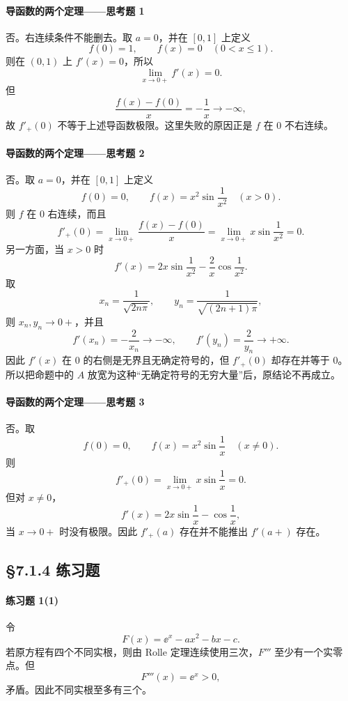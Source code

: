 \paragraph{导函数的两个定理——思考题 1}
\begin{xsolution}
否。右连续条件不能删去。取 $a=0$，并在 $[0,1]$ 上定义
\[
  f(0)=1,
  \qquad
  f(x)=0\quad(0<x\leqslant1).
\]
则在 $(0,1)$ 上 $f'(x)=0$，所以
\[
  \lim_{x\to0+}f'(x)=0.
\]
但
\[
  \frac{f(x)-f(0)}x=-\frac1x\to-\infty,
\]
故 $f'_+(0)$ 不等于上述导函数极限。这里失败的原因正是 $f$ 在 $0$ 不右连续。
\end{xsolution}

\paragraph{导函数的两个定理——思考题 2}
\begin{xsolution}
否。取 $a=0$，并在 $[0,1]$ 上定义
\[
  f(0)=0,
  \qquad
  f(x)=x^2\sin\frac1{x^2}\quad(x>0).
\]
则 $f$ 在 $0$ 右连续，而且
\[
  f'_+(0)=\lim_{x\to0+}\frac{f(x)-f(0)}x
  =\lim_{x\to0+}x\sin\frac1{x^2}=0.
\]
另一方面，当 $x>0$ 时
\[
  f'(x)=2x\sin\frac1{x^2}-\frac2x\cos\frac1{x^2}.
\]
取
\[
  x_n=\frac1{\sqrt{2n\pi}},
  \qquad
  y_n=\frac1{\sqrt{(2n+1)\pi}},
\]
则 $x_n,y_n\to0+$，并且
\[
  f'(x_n)=-\frac2{x_n}\to-\infty,
  \qquad
  f'(y_n)=\frac2{y_n}\to+\infty.
\]
因此 $f'(x)$ 在 $0$ 的右侧是无界且无确定符号的，但 $f'_+(0)$ 却存在并等于 $0$。所以把命题中的 $A$ 放宽为这种“无确定符号的无穷大量”后，原结论不再成立。
\end{xsolution}

\paragraph{导函数的两个定理——思考题 3}
\begin{xsolution}
否。取
\[
  f(0)=0,
  \qquad
  f(x)=x^2\sin\frac1x\quad(x\neq0).
\]
则
\[
  f'_+(0)=\lim_{x\to0+}x\sin\frac1x=0.
\]
但对 $x\neq0$，
\[
  f'(x)=2x\sin\frac1x-\cos\frac1x,
\]
当 $x\to0+$ 时没有极限。因此 $f'_+(a)$ 存在并不能推出 $f'(a+)$ 存在。
\end{xsolution}

\subsection*{§7.1.4 练习题}

\paragraph{练习题 1(1)}
\begin{xsolution}
令
\[
  F(x)=\ee^x-ax^2-bx-c.
\]
若原方程有四个不同实根，则由 Rolle 定理连续使用三次，$F'''$ 至少有一个实零点。但
\[
  F'''(x)=\ee^x>0,
\]
矛盾。因此不同实根至多有三个。
\end{xsolution}

